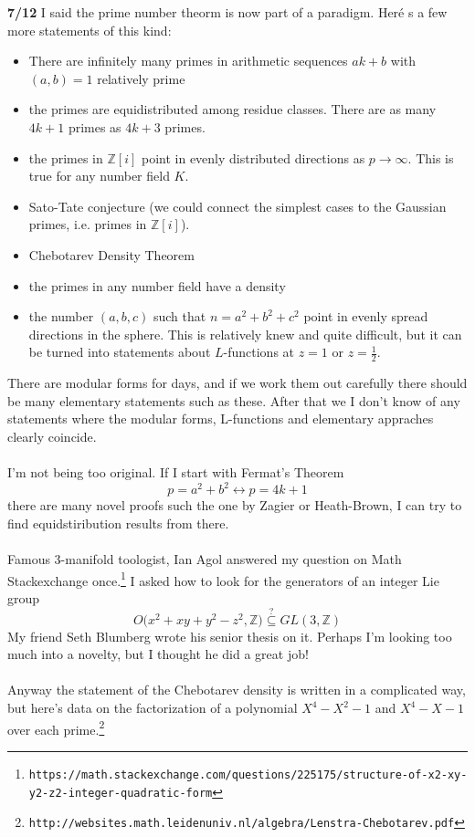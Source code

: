 \documentclass[12pt]{article}
\begin{document}
\noindent \textbf{7/12} I said the prime number theorm is now part of a paradigm.  Heré s a few more statements of this kind:
\begin{itemize}
\item There are infinitely many primes in arithmetic sequences $ak+b$ with $(a,b)=1$ relatively prime
\item the primes are equidistributed among residue classes.  There are as many $4k+1$ primes as $4k+3$ primes.
\item the primes in $\mathbb{Z}[i]$ point in evenly distributed directions as $p \to \infty$.  This is true for any number field $K$.
\item Sato-Tate conjecture (we could connect the simplest cases to the Gaussian primes, i.e. primes in $\mathbb{Z}[i]$).
\item Chebotarev Density Theorem
\item the primes in any number field have a density
\item the number $(a,b,c)$ such that $n = a^2 + b^2 + c^2$ point in evenly spread directions in the sphere.  This is relatively knew and quite difficult, but it can be turned into statements about $L$-functions at $z = 1$ or $z = \frac{1}{2}$. 
\end{itemize} 
There are modular forms for days, and if we work them out carefully there should be many elementary statements such as these. 
After that we I don't know of any statements where the modular forms, L-functions and elementary appraches clearly coincide.  \\ \\
I'm not being too original.  If I start with Fermat's Theorem 
$$ p = a^2 + b^2 \leftrightarrow p = 4k+1 $$
there are many novel proofs such the one by Zagier or Heath-Brown, I can try to find equidstiribution results from there. \\ \\
Famous 3-manifold toologist, Ian Agol answered my question on Math Stackexchange once.\footnote{\texttt{https://math.stackexchange.com/questions/225175/structure-of-x2-xy-y2-z2-integer-quadratic-form}} I asked how to look for the generators of an integer Lie group
$$ O\big( x^2 + xy + y^2 - z^2 , \mathbb{Z} \big) \stackrel{?}{\subseteq} GL(3, \mathbb{Z}) $$
My friend Seth Blumberg wrote his senior thesis on it.  Perhaps I'm looking too much into a novelty, but I thought he did a great job! \\ \\
Anyway the statement of the Chebotarev density is written in a complicated way, but here's data on the factorization of a polynomial $X^4 - X^2 - 1$ and $X^4 - X - 1$ over each prime.\footnote{\texttt{http://websites.math.leidenuniv.nl/algebra/Lenstra-Chebotarev.pdf}}
\end{document}
